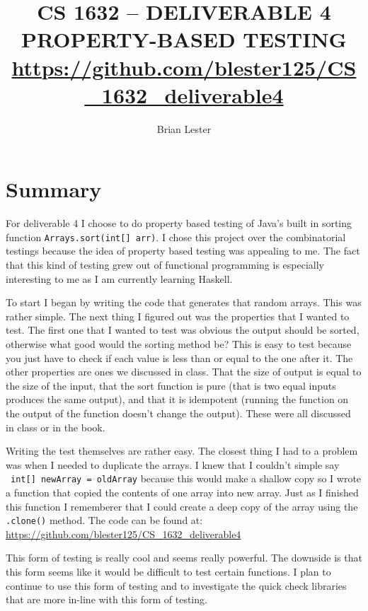 \documentclass[titlepage]{article}
\title{CS 1632 -- DELIVERABLE 4\\
PROPERTY-BASED TESTING\\
\small{\url{https://github.com/blester125/CS_1632_deliverable4}}}
\author{Brian Lester}
\begin{document}
\maketitle
\section{Summary}
For deliverable 4 I choose to do property based testing of Java's built in 
sorting function \lstinline!Arrays.sort(int[] arr)!. I chose this project over 
the combinatorial testings because the idea of property based testing was 
appealing to me. The fact that this kind of testing grew out of functional 
programming is especially interesting to me as I am currently learning Haskell. 

To start I began by writing the code that generates that random arrays. This was 
rather simple. The next thing I figured out was the properties that I wanted to 
test. The first one that I wanted to test was obvious the output should be 
sorted, otherwise what good would the sorting method be? This is easy to test 
because you just have to check if each value is less than or equal to the one 
after it. The other properties are ones we discussed in class. That the size of 
output is equal to the size of the input, that the sort function is pure (that is 
two equal inputs produces the same output), and that it is idempotent (running 
the function on the output of the function doesn't change the output). These were 
all discussed in class or in the book.

Writing the test themselves are rather easy. The closest thing I had to a problem 
was when I needed to duplicate the arrays. I knew that I couldn't simple say \
\lstinline!int[] newArray = oldArray! because this would make a shallow copy so I 
wrote a function that copied the contents of one array into new array. Just as I 
finished this function I rememberer that I could create a deep copy of the array 
using the \lstinline{.clone()} method. The code can be found at: \\
\url{https://github.com/blester125/CS_1632_deliverable4}

This form of testing is really cool and seems really powerful. The downside is 
that this form seems like it would be difficult to test certain functions. I plan 
to continue to use this form of testing and to investigate the quick check 
libraries that are more in-line with this form of testing.
\end{document}

